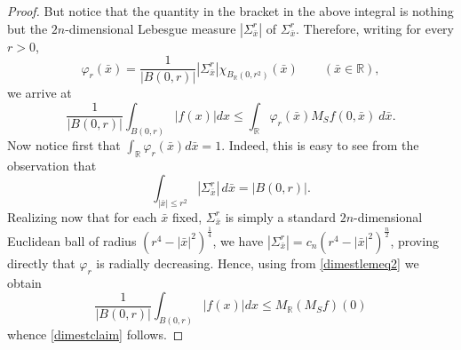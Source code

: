 \documentclass[11pt]{amsart}
\newcommand {\R}{\mathbb R}
\theoremstyle{definition}
\numberwithin{equation}{section}
\begin{document}
\begin{proof}
     But notice that the quantity in the bracket in the above integral is nothing but the $2n$-dimensional Lebesgue measure $|\Sigma^r_{\bar{x}}|$ of $\Sigma^r_{\bar{x}}.$ Therefore, writing for every $r>0$, $$\varphi_r(\bar{x})=\frac{1}{|B(0, r)|}  |\Sigma^r_{\bar{x}}|\chi_{B_{\R}(0,r^2)}(\bar{x})\quad\quad (\bar{x}\in \mathbb{R}),$$ we arrive at 
     \begin{equation}
     \label{dimestlemeq2}
         \frac{1}{|B(0, r)|} \int_{B(0, r)}|f(x)|dx\leq \int_{\R} \varphi_r(\bar{x}) M_Sf(0, \bar{x})~d\bar{x}.
     \end{equation}
    Now notice first that $\int_{\R}\varphi_r(\bar{x})d\bar{x}=1$. Indeed, this is easy to see from the observation that 
    $$\int_{|\bar{x}|\leq r^2} |\Sigma^r_{\bar{x}}|\,d\bar{x}= |B(0, r)|.$$
   Realizing now that for each $\bar{x}$ fixed,  $\Sigma^r_{\bar{x}}$ is simply a standard $2n$-dimensional Euclidean ball of radius $(r^4-|\bar{x}|^2)^{\frac14}$, we have $|\Sigma^r_{\bar{x}}|=c_n (r^4-|\bar{x}|^2)^{\frac{n}2}$, proving directly that $\varphi_r$ is radially decreasing. Hence, using \cite[Theorem 2.1.10]{Classical-Gra} from \eqref{dimestlemeq2} we obtain 
   $$\frac{1}{|B(0, r)|} \int_{B(0, r)}|f(x)|dx\leq M_{\R}(M_Sf)(0)$$
   whence \eqref{dimestclaim} follows.    
\end{proof}
\end{document}
